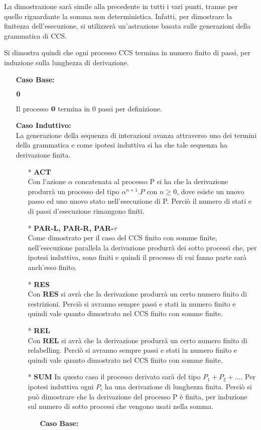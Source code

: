 La dimostrazione sarà simile alla precedente in tutti i vari punti, tranne per quello riguardante la somma non deterministica. Infatti, per dimostrare la finitezza dell'esecuzione, si utilizzerà un'astrazione basata sulle generazioni della grammatica di CCS.

Si dimostra quindi che ogni processo CCS termina in numero finito di passi, per induzione sulla lunghezza di derivazione.

\begin{itemize}
	\item[] \textbf{Caso Base:} \mbox{}
	
	$\mathbf{0}$
	
	Il processo $\mathbf{0}$ termina in 0 passi per definizione.
	\\
	\item[] \textbf{Caso Induttivo:} \mbox{}
	\\
	La generazione della sequenza di interazioni avanza attraverso uno dei termini della grammatica e come ipotesi induttiva si ha che tale sequenza ha derivazione finita.
	\begin{itemize}
		
		\item[*] \textbf{ACT}
		\\
		Con l'azione $\alpha$ concatenata al processo P si ha che la derivazione produrrà un processo del tipo \(\alpha^{n+1}.P\) con \(n \geq 0\), dove esiste un nuovo passo ed uno nuovo stato nell'esecuzione di P. Perciò il numero di stati e di passi d'esecuzione rimangono finiti.
		\\
		\item[*] \textbf{PAR-L, PAR-R, PAR-$\tau$}
		\\
		Come dimostrato per il caso del CCS finito con somme finite, nell'esecuzione parallela la derivazione produrrà dei sotto processi che, per ipotesi induttiva, sono finiti e quindi il processo di cui fanno parte sarà anch'esso finito.
		\\
		\item[*] \textbf{RES}
		\\
		Con \textbf{RES} si avrà che la derivazione produrrà un certo numero finito di restrizioni. Perciò si avranno sempre passi e stati in numero finito e quindi vale quanto dimostrato nel CCS finito con somme finite.
		\\
		\item[*] \textbf{REL}
		\\
		Con \textbf{REL} si avrà che la derivazione produrrà un certo numero finito di relabelling. Perciò si avranno sempre passi e stati in numero finito e quindi vale quanto dimostrato nel CCS finito con somme finite.
		\\
		\item[*] \textbf{SUM}
		In questo caso il processo derivato sarà del tipo \(P_1+P_2+\ldots\). Per ipotesi induttiva ogni \(P_i\) ha una derivazione di lunghezza finita. Perciò si può dimostrare che la derivazione del processo P è finita, per induzione sul numero di sotto processi che vengono usati nella somma. \\
		\begin{itemize}
			\item[] \textbf{Caso Base:} \mbox{}
			

\end{itemize}
\end{itemize}
\end{itemize}
